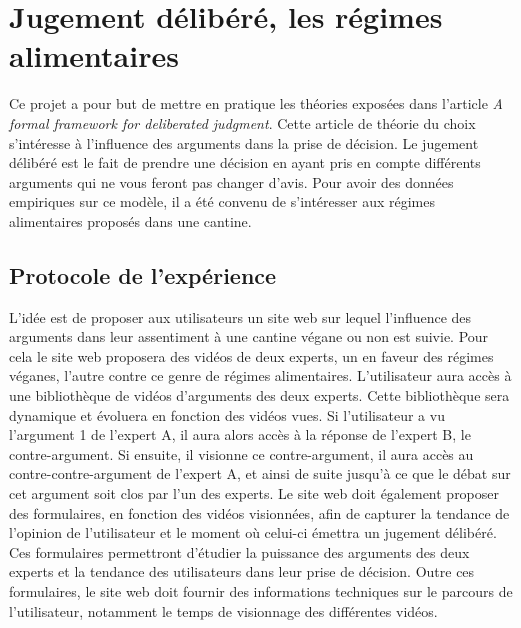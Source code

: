 \chapter[Jugement délibéré, les régimes alimentaires]{Jugement délibéré, les régimes alimentaires\raisebox{.3\baselineskip}{\normalsize\footnotemark}}
Ce projet a pour but de mettre en pratique les théories exposées dans l'article \textit{A formal framework for deliberated judgment}\cite{cailloux_formal_2020}. Cette article de théorie du choix s'intéresse à l'influence des arguments dans la prise de décision. Le jugement délibéré est le fait de prendre une décision en ayant pris en compte différents arguments qui ne vous feront pas changer d'avis. Pour avoir des données empiriques sur ce modèle, il a été convenu de s'intéresser aux régimes alimentaires proposés dans une cantine.

\section{Protocole de l'expérience}
L'idée est de proposer aux utilisateurs un site web sur lequel l'influence des arguments dans leur assentiment à une cantine végane ou non est suivie. Pour cela le site web proposera des vidéos de deux experts, un en faveur des régimes véganes, l'autre contre ce genre de régimes alimentaires. L'utilisateur aura accès à une bibliothèque de vidéos d'arguments des deux experts. Cette bibliothèque sera dynamique et évoluera en fonction des vidéos vues. Si l'utilisateur a vu l'argument 1 de l'expert A, il aura alors accès à la réponse de l'expert B, le contre-argument. Si ensuite, il visionne ce contre-argument, il aura accès au contre-contre-argument de l'expert A, et ainsi de suite jusqu'à ce que le débat sur cet argument soit clos par l'un des experts. Le site web doit également proposer des formulaires, en fonction des vidéos visionnées, afin de capturer la tendance de l'opinion de l'utilisateur et le moment où celui-ci émettra un jugement délibéré. Ces formulaires permettront d'étudier la puissance des arguments des deux experts et la tendance des utilisateurs dans leur prise de décision. Outre ces formulaires, le site web doit fournir des informations techniques sur le parcours de l'utilisateur, notamment le temps de visionnage des différentes vidéos.

